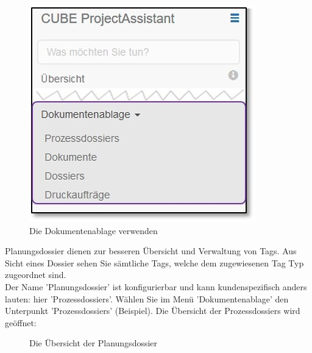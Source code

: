 \begin{figure}
  \vspace{-20pt}
  \begin{center}
    \includegraphics[width=1\linewidth]{../chapters/11_Dokumentenablage/pictures/11_Menu_Dokumentenablage_s.jpg}
  \end{center}
  \vspace{-20pt}
  \caption{Die Dokumentenablage verwenden}
  \vspace{-10pt}
\end{figure}

Planungsdossier dienen zur besseren Übersicht und Verwaltung von Tags. Aus Sicht eines Dossier sehen Sie sämtliche Tags, welche dem zugewiesenen Tag Typ zugeordnet sind.\\

Der Name 'Planungsdossier' ist konfigurierbar und kann kundenspezifisch anders lauten: hier 'Prozessdossiers'. Wählen Sie im Menü 'Dokumentenablage' den Unterpunkt 'Prozessdossiers' (Beispiel). Die Übersicht der Prozessdossiers wird geöffnet:

\begin{figure}[H]
\caption{Die Übersicht der Planungsdossier}
\end{figure}

